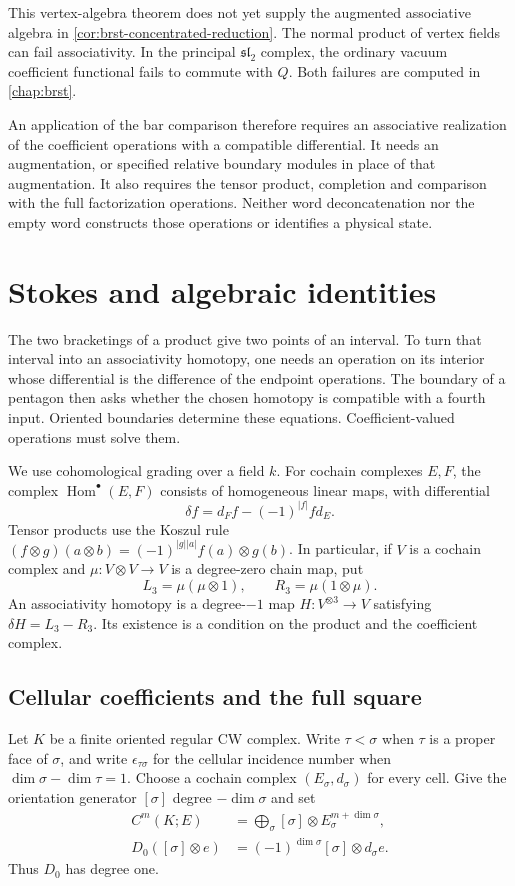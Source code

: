 This vertex-algebra theorem does not yet supply the augmented
associative algebra in \cref{cor:brst-concentrated-reduction}.
The normal product of vertex fields can fail associativity.
In the principal $\mathfrak{sl}_2$ complex, the ordinary vacuum
coefficient functional fails to commute with $Q$.
Both failures are computed in \cref{chap:brst}.

An application of the bar comparison therefore requires an
associative realization of the coefficient operations with a
compatible differential.
It needs an augmentation, or specified relative boundary modules
in place of that augmentation.
It also requires the tensor product, completion and comparison
with the full factorization operations.
Neither word deconcatenation nor the empty word constructs
those operations or identifies a physical state.

\chapter{Stokes and algebraic identities}\label{ch:stokes-identities}
The two bracketings of a product give two points of an interval.
To turn that interval into an associativity homotopy, one needs
an operation on its interior whose differential is the difference
of the endpoint operations.
The boundary of a pentagon then asks whether the chosen homotopy
is compatible with a fourth input.
Oriented boundaries determine these equations.
Coefficient-valued operations must solve them.

We use cohomological grading over a field $k$.
For cochain complexes $E,F$, the complex
$\operatorname{Hom}^\bullet(E,F)$ consists of homogeneous linear maps,
with differential
\[
 \delta f=d_Ff-(-1)^{|f|}fd_E.
\]
Tensor products use the Koszul rule
$(f\otimes g)(a\otimes b)=(-1)^{|g||a|}f(a)\otimes g(b)$.
In particular, if $V$ is a cochain complex and
$\mu:V\otimes V\to V$ is a degree-zero chain map, put
\[
 L_3=\mu(\mu\otimes1),\qquad
 R_3=\mu(1\otimes\mu).
\]
An associativity homotopy is a degree-$-1$ map
$H:V^{\otimes3}\to V$ satisfying $\delta H=L_3-R_3$.
Its existence is a condition on the product and the coefficient complex.

\section{Cellular coefficients and the full square}
Let $K$ be a finite oriented regular CW complex.
Write $\tau<\sigma$ when $\tau$ is a proper face of $\sigma$,
and write $\epsilon_{\tau\sigma}$ for the cellular incidence number
when $\dim\sigma-\dim\tau=1$.
Choose a cochain complex $(E_\sigma,d_\sigma)$ for every cell.
Give the orientation generator $[\sigma]$ degree $-\dim\sigma$ and set
\[
 \begin{aligned}
 C^m(K;E)&=\bigoplus_\sigma
 [\sigma]\otimes E_\sigma^{m+\dim\sigma},\\
 D_0([\sigma]\otimes e)&=
 (-1)^{\dim\sigma}[\sigma]\otimes d_\sigma e.
 \end{aligned}
\]
Thus $D_0$ has degree one.

